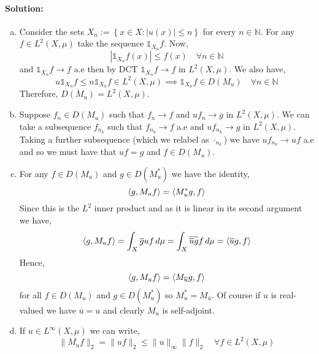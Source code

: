\paragraph{Solution:}
\begin{enumerate}[(a)]
	\item
		Consider the sets $X_{n}:=\left\{x\in X\colon |u(x)|\leq n\right\}$ for every $n\in\mathbb{N}$. For any $f\in L^{2}(X,\mu)$ take the sequence $\mathds{1}_{X_{n}}f$. Now,
		\begin{equation*}
			|\mathds{1}_{X_{n}}f(x)|\leq f(x) \quad \forall n\in\mathbb{N}
		\end{equation*}
		and $\mathds{1}_{X_{n}}f\to f$ a.e then by DCT $\mathds{1}_{X_{n}}f\to f$ in $L^{2}(X,\mu)$. We also have,
		\begin{equation*}
			u\mathds{1}_{X_{n}}f \leq n\mathds{1}_{X_{n}}f\in L^{2}(X,\mu)\implies \mathds{1}_{X_{n}}f\in D(M_{u}) \quad \forall n\in\mathbb{N}
		\end{equation*}
		Therefore, $\overline{D(M_{u})} = L^{2}(X,\mu)$.
	\item
		Suppose $f_{n}\in D(M_{u})$ such that $f_{n}\to f$ and $uf_{n}\to g$ in $L^{2}(X,\mu)$. We can take a subsequence $f_{n_{k}}$ such that $f_{n_{k}}\to f$ a.e and $uf_{n_{k}}\to g$ in $L^{2}(X,\mu)$. Taking a further subsequence (which we relabel as $\cdot_{n_{k}}$) we have $uf_{n_{k}}\to uf$ a.e and so we must have that $uf = g$ and $f\in D(M_{u})$.
	\item
		For any $f\in D(M_{u})$ and $g\in D(M_{u}^{*})$ we have the identity,
		\begin{equation*}
			\braket{g,M_{u}f} = \braket{M_{u}^{*}g,f}
		\end{equation*}
		Since this is the $L^{2}$ inner product and as it is linear in its second argument we have,
		\begin{equation*}
			\braket{g,M_{u}f} = \int_{X}\overline{g}uf\,d\mu = \int_{X}\overline{\overline{u}g}f\,d\mu = \braket{\overline{u}g,f}
		\end{equation*}
		Hence,
		\begin{equation*}
			\braket{g,M_{u}f} = \braket{M_{\overline{u}}g,f}
		\end{equation*}
		for all $f\in D(M_{u})$ and $g\in D(M_{u}^{*})$ so $M_{u}^{*} = M_{\overline{u}}$. Of course if $u$ is real-valued we have $\overline{u}=u$ and clearly $M_{u}$ is self-adjoint.
	\item
		If $u\in L^{\infty}(X,\mu)$ we can write,
		\begin{equation*}
			\|M_{u}f\|_{2} = \|uf\|_{2}\leq \|u\|_{\infty}\|f\|_{2} \quad \forall f\in L^{2}(X,\mu)
		\end{equation*}
\end{enumerate}

